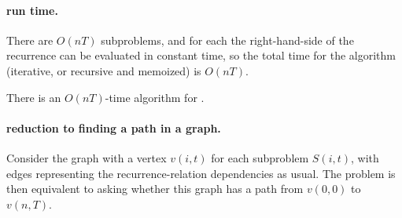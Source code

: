 \paragraph{run time.}
There are $O(nT)$ subproblems, and for each the right-hand-side of the recurrence
can be evaluated in constant time, so the total time for the algorithm
(iterative, or recursive and memoized) is $O(nT)$.

\begin{theorem}
  There is an $O(nT)$-time algorithm for .
\end{theorem}

\paragraph{reduction to finding a path in a graph.}
Consider the graph with a vertex $v(i,t)$ for each subproblem $S(i, t)$,
with edges representing the recurrence-relation dependencies as usual.
The problem is then equivalent to asking whether this graph has a path from $v(0,0)$ to $v(n,T)$.


